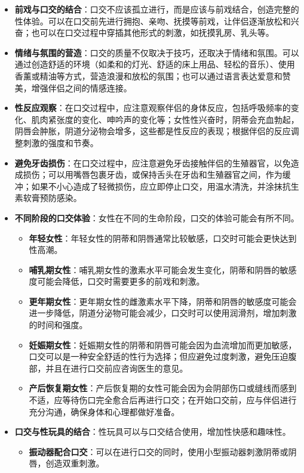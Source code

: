 \documentclass[12pt,UTF8]{ctexbook}
\begin{document}
  \begin{itemize}
  \item \textbf{前戏与口交的结合}：口交不应该孤立进行，而是应该与前戏结合，创造完整的性体验。可以在口交前先进行拥抱、亲吻、抚摸等前戏，让伴侣逐渐放松和兴奋；也可以在口交过程中穿插其他形式的刺激，如抚摸乳房、乳头等。
  \item \textbf{情绪与氛围的营造}：口交的质量不仅取决于技巧，还取决于情绪和氛围。可以通过创造舒适的环境（如柔和的灯光、舒适的床上用品、轻松的音乐）、使用香薰或精油等方式，营造浪漫和放松的氛围；也可以通过语言表达爱意和赞美，增强伴侣之间的情感连接。
  \item \textbf{性反应观察}：在口交过程中，应注意观察伴侣的身体反应，包括呼吸频率的变化、肌肉紧张度的变化、呻吟声的变化等；女性性兴奋时，阴蒂会充血勃起，阴唇会肿胀，阴道分泌物会增多，这些都是性反应的表现；根据伴侣的反应调整刺激的强度和节奏。
  \item \textbf{避免牙齿损伤}：在口交过程中，应注意避免牙齿接触伴侣的生殖器官，以免造成损伤；可以用嘴唇包裹牙齿，或保持舌头在牙齿和生殖器官之间，作为缓冲；如果不小心造成了轻微损伤，应立即停止口交，用温水清洗，并涂抹抗生素软膏预防感染。
  \item \textbf{不同阶段的口交体验}：女性在不同的生命阶段，口交的体验可能会有所不同。
    \begin{itemize}
    \item \textbf{年轻女性}：年轻女性的阴蒂和阴唇通常比较敏感，口交时可能会更快达到性高潮。
    \item \textbf{哺乳期女性}：哺乳期女性的激素水平可能会发生变化，阴蒂和阴唇的敏感度可能会降低，口交时需要更多的前戏和刺激。
    \item \textbf{更年期女性}：更年期女性的雌激素水平下降，阴蒂和阴唇的敏感度可能会进一步降低，阴道分泌物可能会减少，口交时可以使用润滑剂，增加刺激的时间和强度。
    \item \textbf{妊娠期女性}：妊娠期女性的阴蒂和阴唇可能会因为血流增加而更加敏感，口交可以是一种安全舒适的性行为选择；但应避免过度刺激，避免压迫腹部，并且在进行口交前应咨询医生的意见。
    \item \textbf{产后恢复期女性}：产后恢复期的女性可能会因为会阴部伤口或缝线而感到不适，应等待伤口完全愈合后再进行口交；在开始口交前，应与伴侣进行充分沟通，确保身体和心理都做好准备。
    \end{itemize}
  \item \textbf{口交与性玩具的结合}：性玩具可以与口交结合使用，增加性快感和趣味性。
    \begin{itemize}
    \item \textbf{振动器配合口交}：可以在进行口交的同时，使用小型振动器刺激阴蒂或阴唇，创造双重刺激。

\end{itemize}
\end{itemize}
\end{document}
